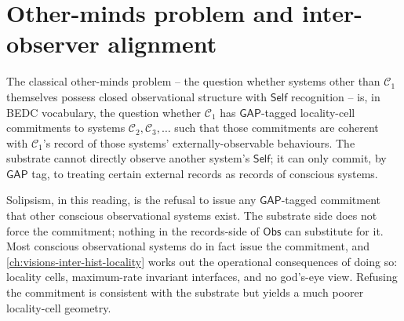 \section{Other-minds problem and inter-observer alignment}
\label{sec:hard-problems-other-minds}

\begin{principle}
\label{prin:hard-problems-other-minds-as-locality-cell}
The classical other-minds problem -- the question whether systems other than $\mathcal{C}_1$ themselves possess closed observational structure with $\mathsf{Self}$ recognition -- is, in BEDC vocabulary, the question whether $\mathcal{C}_1$ has $\mathsf{GAP}$-tagged locality-cell commitments to systems $\mathcal{C}_2, \mathcal{C}_3, \ldots$ such that those commitments are coherent with $\mathcal{C}_1$'s record of those systems' externally-observable behaviours. The substrate cannot directly observe another system's $\mathsf{Self}$; it can only commit, by $\mathsf{GAP}$ tag, to treating certain external records as records of conscious systems.
\end{principle}

\begin{remark}
\label{rem:hard-problems-solipsism-as-gap-refusal}
Solipsism, in this reading, is the refusal to issue any $\mathsf{GAP}$-tagged commitment that other conscious observational systems exist. The substrate side does not force the commitment; nothing in the records-side of $\mathsf{Obs}$ can substitute for it. Most conscious observational systems do in fact issue the commitment, and \autoref{ch:visions-inter-hist-locality} works out the operational consequences of doing so: locality cells, maximum-rate invariant interfaces, and no god's-eye view. Refusing the commitment is consistent with the substrate but yields a much poorer locality-cell geometry.
\end{remark}

